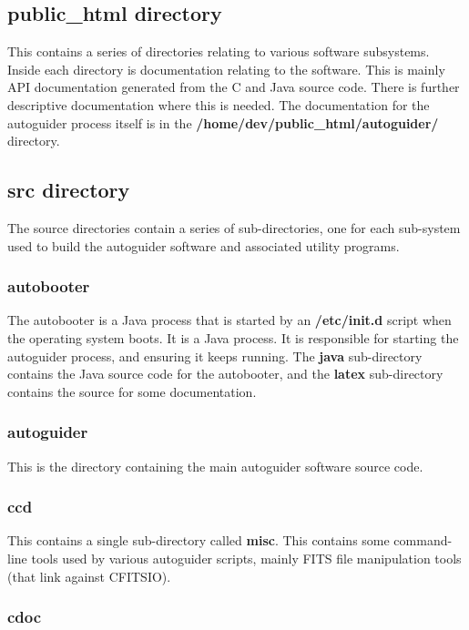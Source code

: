 \documentclass[10pt,a4paper]{article}
\begin{document}
\subsection{public\_html directory}

This contains a series of directories relating to various software subsystems. Inside each directory is documentation relating to the software. This is mainly API documentation generated from the C and Java source code. There is further descriptive documentation where this is needed. The documentation for the autoguider process itself is in the {\bf /home/dev/public\_html/autoguider/} directory.

\subsection{src directory}

The source directories contain a series of sub-directories, one for each sub-system used to build the autoguider software and associated utility programs.

\subsubsection{autobooter}

The autobooter is a Java process that is started by an {\bf /etc/init.d} script when the operating system boots. It is a Java process. It is responsible for starting the autoguider process, and ensuring it keeps running. The {\bf java} sub-directory contains the Java source code for the autobooter, and the {\bf latex} sub-directory contains the source for some documentation.

\subsubsection{autoguider}

This is the directory containing the main autoguider software source code. 

\subsubsection{ccd}

This contains a single sub-directory called {\bf misc}. This contains some command-line tools used by various autoguider scripts, mainly FITS file manipulation tools (that link against CFITSIO).

\subsubsection{cdoc}
\end{document}
